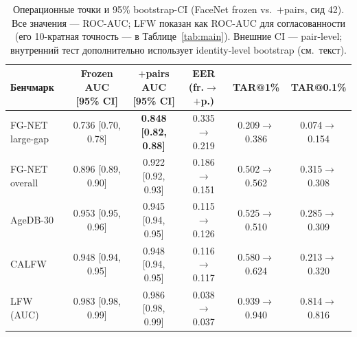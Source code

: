\documentclass[journal]{IEEEtran}
\begin{document}
\begin{table}[!t]
\renewcommand{\arraystretch}{1.2}
\caption{Операционные точки и 95\% bootstrap-CI (FaceNet frozen vs.\ $+$pairs, сид 42). Все значения --- ROC-AUC; LFW показан как ROC-AUC для согласованности (его 10-кратная точность --- в Таблице~\ref{tab:main}). Внешние CI --- pair-level; внутренний тест дополнительно использует identity-level bootstrap (см.\ текст).}
\label{tab:stats}
\centering
\footnotesize
\begin{tabular}{@{}lccccc@{}}
\toprule
Бенчмарк & Frozen AUC [95\% CI] & $+$pairs AUC [95\% CI] & EER (fr.$\to$$+$p.) & TAR@1\% & TAR@0.1\% \\
\midrule
FG-NET large-gap & 0.736 [0.70, 0.78] & \textbf{0.848 [0.82, 0.88]} & 0.335$\to$0.219 & 0.209$\to$0.386 & 0.074$\to$0.154 \\
FG-NET overall & 0.896 [0.89, 0.90] & 0.922 [0.92, 0.93] & 0.186$\to$0.151 & 0.502$\to$0.562 & 0.315$\to$0.308 \\
AgeDB-30 & 0.953 [0.95, 0.96] & 0.945 [0.94, 0.95] & 0.115$\to$0.126 & 0.525$\to$0.510 & 0.285$\to$0.309 \\
CALFW & 0.948 [0.94, 0.95] & 0.948 [0.94, 0.95] & 0.116$\to$0.117 & 0.580$\to$0.624 & 0.213$\to$0.320 \\
LFW (AUC) & 0.983 [0.98, 0.99] & 0.986 [0.98, 0.99] & 0.038$\to$0.037 & 0.939$\to$0.940 & 0.814$\to$0.816 \\
\bottomrule
\end{tabular}
\end{table}
\end{document}
